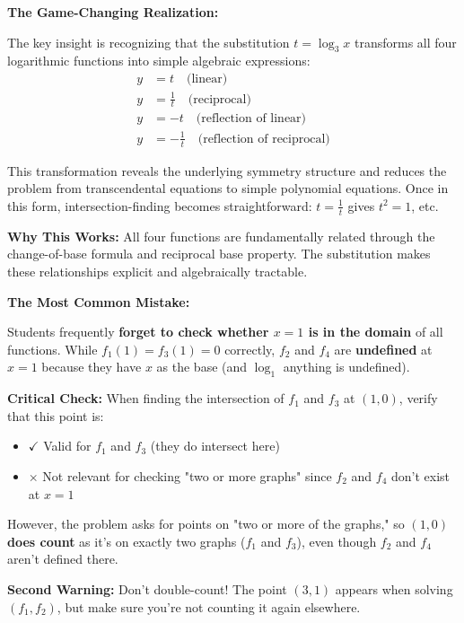 \documentclass[12pt]{article}
\begin{document}
\begin{insightbox}
\textbf{The Game-Changing Realization:}

The key insight is recognizing that the substitution $t = \log_3 x$ transforms all four logarithmic functions into simple algebraic expressions:
\begin{align*}
y &= t \quad \text{(linear)} \\
y &= \frac{1}{t} \quad \text{(reciprocal)} \\
y &= -t \quad \text{(reflection of linear)} \\
y &= -\frac{1}{t} \quad \text{(reflection of reciprocal)}
\end{align*}

This transformation reveals the underlying symmetry structure and reduces the problem from transcendental equations to simple polynomial equations. Once in this form, intersection-finding becomes straightforward: $t = \frac{1}{t}$ gives $t^2 = 1$, etc.

\textbf{Why This Works:} All four functions are fundamentally related through the change-of-base formula and reciprocal base property. The substitution makes these relationships explicit and algebraically tractable.
\end{insightbox}

\begin{warningbox}
\textbf{The Most Common Mistake:}

Students frequently \textbf{forget to check whether $x = 1$ is in the domain} of all functions. While $f_1(1) = f_3(1) = 0$ correctly, $f_2$ and $f_4$ are \textbf{undefined} at $x = 1$ because they have $x$ as the base (and $\log_1$ anything is undefined).

\textbf{Critical Check:} When finding the intersection of $f_1$ and $f_3$ at $(1, 0)$, verify that this point is:
\begin{itemize}
    \item $\checkmark$ Valid for $f_1$ and $f_3$ (they do intersect here)
    \item $\times$ Not relevant for checking "two or more graphs" since $f_2$ and $f_4$ don't exist at $x = 1$
\end{itemize}

However, the problem asks for points on "two or more of the graphs," so $(1, 0)$ \textbf{does count} as it's on exactly two graphs ($f_1$ and $f_3$), even though $f_2$ and $f_4$ aren't defined there.

\textbf{Second Warning:} Don't double-count! The point $(3, 1)$ appears when solving $(f_1, f_2)$, but make sure you're not counting it again elsewhere.
\end{warningbox}
\end{document}
